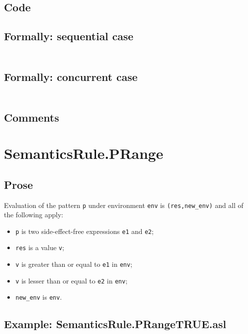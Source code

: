 \documentclass{book}
\begin{document}
  \subsection{Code}

  \subsection{Formally: sequential case}
  \begin{align}
  \end{align} 

  \subsection{Formally: concurrent case}
  \begin{align}
  \end{align} 

    \subsection{Comments}

\section{SemanticsRule.PRange \label{sec:SemanticsRule.PRange}}

    \subsection{Prose}
   Evaluation of the pattern \texttt{p} under environment \texttt{env} is
  \texttt{(res,new\_env)} and all of the following apply:
    \begin{itemize}
    \item \texttt{p} is two side-effect-free expressions \texttt{e1} and \texttt{e2};
    \item \texttt{res} is a value \texttt{v};
    \item \texttt{v} is greater than or equal to \texttt{e1} in \texttt{env};
    \item \texttt{v} is lesser than or equal to \texttt{e2} in \texttt{env};
    \item \texttt{new\_env} is \texttt{env}.
    \end{itemize}

    \subsection{Example: SemanticsRule.PRangeTRUE.asl}
\end{document}
